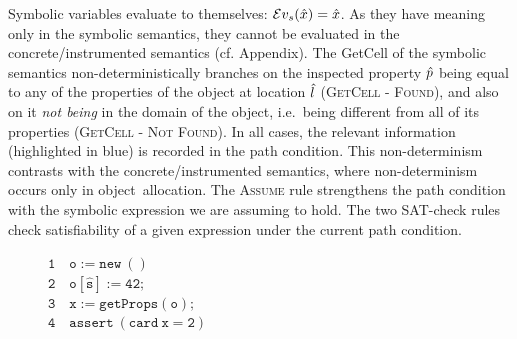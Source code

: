\noindent Symbolic variables evaluate to themselves: $\mathcal{E}v_{s}(\hat{x}) = \hat{x}$. 
As they have meaning only in the symbolic semantics, they cannot be evaluated in the concrete/instrumented semantics (cf. Appendix). 
The GetCell of the symbolic semantics non-deterministically branches on the inspected property $\hat{p}$ being equal to any of the properties of the object at location $\hat{l}$ (\textsc{GetCell - Found}), and also on it \emph{not being} in the domain of the object, i.e.~being different from all of its properties (\textsc{GetCell - Not Found}). In all cases, the relevant information (highlighted in blue) is recorded in the path condition. This non-determinism contrasts with the concrete/instrumented semantics, where non-determinism occurs only in object~allocation. 
The \textsc{Assume} rule strengthens the path condition with the symbolic expression we are assuming to hold. The two SAT-check rules check satisfiability of a given expression under the current path condition. 

 

\begin{figure}
\vspace*{-0.3cm}
{\footnotesize
\hspace*{-0.55cm} $\mathtt{1\quad o := new\ ()}$ \\[-0.06cm]
\hspace*{-0.55cm} $\mathtt{2\quad o[\hat{s}] := 42};$ \\[-0.06cm]
\hspace*{-0.55cm} $\mathtt{3\quad x := getProps(o);}$ \\[-0.06cm]
\hspace*{-0.55cm} $\mathtt{4\quad assert\ (card \ x = 2)}$
}
\vspace*{-0.35cm}
\end{figure}


